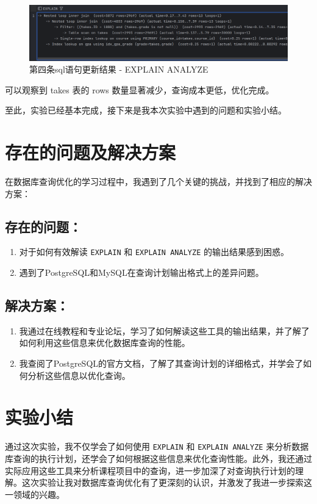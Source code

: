 \documentclass{article}
\begin{document}
	\begin{figure}[H]
		\centering
		\includegraphics[width=15cm]{./images/24.更新结果-4.png}
		\caption{第四条sql语句更新结果 - EXPLAIN ANALYZE}
	\end{figure}
	
	可以观察到 takes 表的 rows 数量显著减少，查询成本更低，优化完成。
	
	至此，实验已经基本完成，接下来是我本次实验中遇到的问题和实验小结。
	
	\section{存在的问题及解决方案}
	
	在数据库查询优化的学习过程中，我遇到了几个关键的挑战，并找到了相应的解决方案：
	
	\subsection{存在的问题：}
	
	\begin{enumerate}[noitemsep, label={{\arabic*})}]
		\item 对于如何有效解读 \texttt{EXPLAIN} 和 \texttt{EXPLAIN ANALYZE} 的输出结果感到困惑。
		\item 遇到了PostgreSQL和MySQL在查询计划输出格式上的差异问题。
	\end{enumerate}\textbf{}
	
	\subsection{解决方案：}
	
	\begin{enumerate}[noitemsep, label={{\arabic*})}]
		\item 我通过在线教程和专业论坛，学习了如何解读这些工具的输出结果，并了解了如何利用这些信息来优化数据库查询的性能。
		\item 我查阅了PostgreSQL的官方文档，了解了其查询计划的详细格式，并学会了如何分析这些信息以优化查询。
	\end{enumerate}\textbf{}
	
	\section{实验小结}
	
	通过这次实验，我不仅学会了如何使用 \texttt{EXPLAIN} 和 \texttt{EXPLAIN ANALYZE} 来分析数据库查询的执行计划，还学会了如何根据这些信息来优化查询性能。此外，我还通过实际应用这些工具来分析课程项目中的查询，进一步加深了对查询执行计划的理解。这次实验让我对数据库查询优化有了更深刻的认识，并激发了我进一步探索这一领域的兴趣。
	
\end{document}
